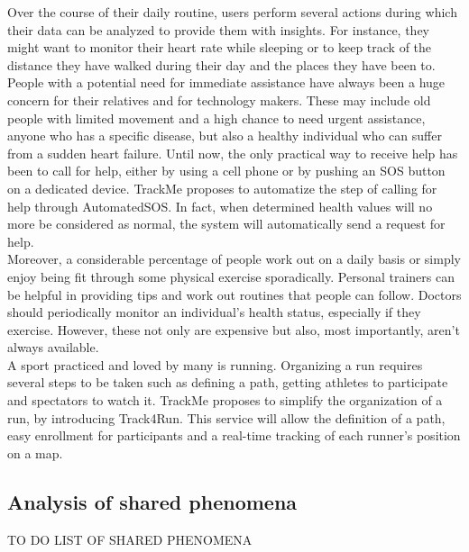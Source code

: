 \documentclass{report}
\begin{document}
Over the course of their daily routine, users perform several actions during which their data can be analyzed to provide them with insights. For instance, they might want to monitor their heart rate while sleeping or to keep track of the distance they have walked during their day and the places they have been to.\\
People with a potential need for immediate assistance have always been a huge concern for their relatives and for technology makers. These may include old people with limited movement and a high chance to need urgent assistance, anyone who has a specific disease, but also a healthy individual who can suffer from a sudden heart failure. Until now, the only practical way to receive help has been to call for help, either by using a cell phone or by pushing an SOS button on a dedicated device. TrackMe proposes to automatize the step of calling for help through AutomatedSOS. In fact, when determined health values will no more be considered as normal, the system will automatically send a request for help.\\
Moreover, a considerable percentage of people work out on a daily basis or simply enjoy being fit through some physical exercise sporadically. Personal trainers can be helpful in providing tips and work out routines that people can follow. Doctors should periodically monitor an individual’s health status, especially if they exercise. However, these not only are expensive but also, most importantly, aren’t always available.\\
A sport practiced and loved by many is running. Organizing a run requires several steps to be taken such as defining a path, getting athletes to participate and spectators to watch it. TrackMe proposes to simplify the organization of a run, by introducing Track4Run. This service will allow the definition of a path, easy enrollment for participants and a real-time tracking of each runner’s position on a map.
			\subsection{Analysis of shared phenomena}
			TO DO LIST OF SHARED PHENOMENA
			
\end{document}
